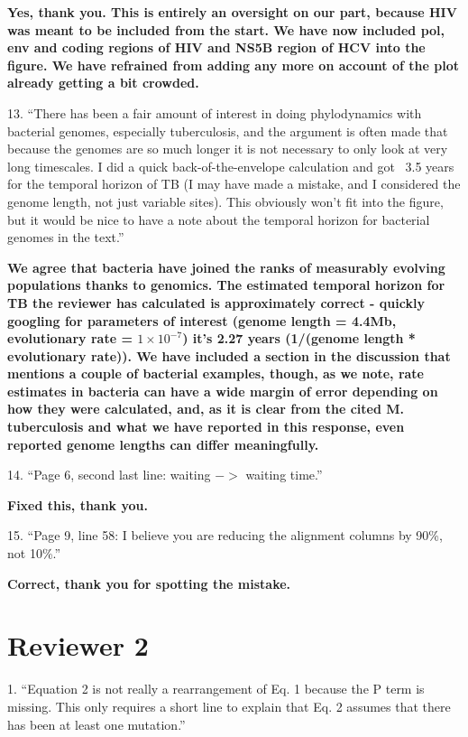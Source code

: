 \documentclass[11pt,oneside,letterpaper]{article}
\begin{document}
\textbf{Yes, thank you. This is entirely an oversight on our part, because HIV was meant to be included from the start. We have now included pol, env and coding regions of HIV and NS5B region of HCV into the figure. We have refrained from adding any more on account of the plot already getting a bit crowded.}

13. ``There has been a fair amount of interest in doing phylodynamics with bacterial genomes, especially tuberculosis, and the argument is often made that because the genomes are so much longer it is not necessary to only look at very long timescales. I did a quick back-of-the-envelope calculation and got ~3.5 years for the temporal horizon of TB (I may have made a mistake, and I considered the genome length, not just variable sites). This obviously won't fit into the figure, but it would be nice to have a note about the temporal horizon for bacterial genomes in the text.''

\textbf{We agree that bacteria have joined the ranks of measurably evolving populations thanks to genomics. The estimated temporal horizon for TB the reviewer has calculated is approximately correct - quickly googling for parameters of interest (genome length = 4.4Mb, evolutionary rate = $1\times10^{-7}$) it's 2.27 years (1/(genome length * evolutionary rate)). We have included a section in the discussion that mentions a couple of bacterial examples, though, as we note, rate estimates in bacteria can have a wide margin of error depending on how they were calculated, and, as it is clear from the cited M. tuberculosis and what we have reported in this response, even reported genome lengths can differ meaningfully.}

14. ``Page 6, second last line: waiting $->$ waiting time.''

\textbf{Fixed this, thank you.}

15. ``Page 9, line 58: I believe you are reducing the alignment columns by 90\%, not 10\%.''

\textbf{Correct, thank you for spotting the mistake.}

\section*{Reviewer 2}

1. ``Equation 2 is not really a rearrangement of Eq. 1 because the P term is missing. This only requires a short line to explain that Eq. 2 assumes that there has been at least one mutation.''
\end{document}
